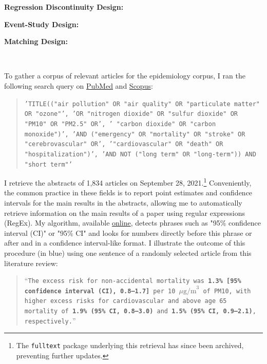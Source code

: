 \documentclass[12pt]{article}
\begin{document}
	\noindent\textbf{Regression Discontinuity Design:} \cite{chen_air_2018, fan_winter_2020, anderson_bounds_2022}
	
	\noindent\textbf{Event-Study Design:} \cite{mullins_effects_2015, simeonova_congestion_2021}
	
	\noindent\textbf{Matching Design:} \cite{baccini_assessing_2017, forastiere_assessing_2020}
	
	\onehalfspacing
	~
	
	To gather a corpus of relevant articles for the epidemiology corpus, I ran the following search query on \href{https://www.ncbi.nlm.nih.gov/}{PubMed} and \href{https://www.scopus.com/home.uri}{Scopus}:
               
        \begin{quote}
       \footnotesize\texttt{'TITLE(("air pollution" OR "air quality" OR "particulate matter" OR "ozone"', 'OR "nitrogen dioxide" OR "sulfur dioxide" OR "PM10" OR "PM2.5" OR', ' "carbon dioxide" OR "carbon monoxide")',  'AND ("emergency" OR "mortality" OR "stroke" OR "cerebrovascular" OR', '"cardiovascular" OR "death" OR "hospitalization")', 'AND NOT ("long term" OR "long-term")) AND "short term"'}
        \end{quote}

      I retrieve the abstracts of 1,834 articles on September 28, 2021.\footnote{The \texttt{fulltext} package underlying this retrieval has since been archived, preventing further updates.} Conveniently, the common practice in these fields is to report point estimates and confidence intervals for the main results in the abstracts, allowing me to automatically retrieve information on the main results of a paper using regular expressions (RegEx). My algorithm, available \href{https://vincentbagilet.github.io/inference_pollution/automatic_lit_review_getting_abstracts.html}{online}, detects phrases such as "95\% confidence interval (CI)" or "95\% CI" and looks for numbers directly before this phrase or after and in a confidence interval-like format. I illustrate the outcome of this procedure (in blue) using one sentence of a randomly selected article from this literature review:%
        
\begin{sloppypar}
        \begin{quote}
         \footnotesize    “\texttt{The excess risk for non-accidental mortality was \textbf{\color{cerulean}1.3\% [95\% confidence interval (CI), 0.8–1.7]} per 10 $\mu \text{g/m}^3$ of PM10, with higher excess risks for cardiovascular and above age 65 mortality of \textbf{\color{cerulean}1.9\% (95\% CI, 0.8–3.0)} and \textbf{\color{cerulean}1.5\% (95\% CI, 0.9–2.1)}, respectively.}”
        \end{quote}
\end{sloppypar}
\end{document}
